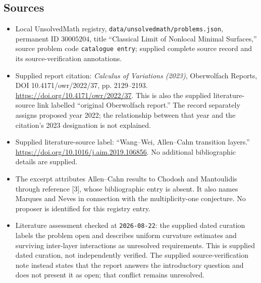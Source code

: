 \documentclass[11pt]{article}
\begin{document}
\subsection{Sources}
\begin{itemize}
\item Local UnsolvedMath registry, \texttt{data/unsolvedmath/problems.json}, permanent ID \(30005204\), title ``Classical Limit of Nonlocal Minimal Surfaces,'' source problem code \texttt{catalogue entry}; supplied complete source record and its source-verification annotations.
\item Supplied report citation: \emph{Calculus of Variations (2023)}, Oberwolfach Reports, DOI 10.4171/owr/2022/37, pp. 2129--2193. \url{https://doi.org/10.4171/owr/2022/37}. This is also the supplied literature-source link labelled ``original Oberwolfach report.'' The record separately assigns proposed year 2022; the relationship between that year and the citation's 2023 designation is not explained.
\item Supplied literature-source label: ``Wang--Wei, Allen--Cahn transition layers.'' \url{https://doi.org/10.1016/j.aim.2019.106856}. No additional bibliographic details are supplied.
\item The excerpt attributes Allen--Cahn results to Chodosh and Mantoulidis through reference [3], whose bibliographic entry is absent. It also names Marques and Neves in connection with the multiplicity-one conjecture. No proposer is identified for this registry entry.
\item Literature assessment checked at \texttt{2026-08-22}: the supplied dated curation labels the problem open and describes uniform curvature estimates and surviving inter-layer interactions as unresolved requirements. This is supplied dated curation, not independently verified. The supplied source-verification note instead states that the report answers the introductory question and does not present it as open; that conflict remains unresolved.
\end{itemize}
\end{document}
